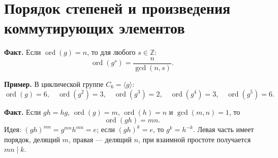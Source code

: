 \documentclass[12pt,a4paper]{article}
\newcommand{\Z}{\mathbb{Z}}
\DeclareMathOperator{\ord}{ord}
\DeclareMathOperator{\gcdop}{gcd}
\begin{document}
\section{Порядок степеней и произведения коммутирующих элементов}

\textbf{Факт.}
Если $\ord(g)=n$, то для любого $s\in\Z$:
\[
\ord(g^s)=\frac{n}{\gcdop(n,s)}.
\]

\textbf{Пример.}
В циклической группе $C_6=\langle g\rangle$:
\[
\ord(g)=6,\quad \ord(g^2)=3,\quad \ord(g^3)=2,\quad \ord(g^4)=3,\quad \ord(g^5)=6.
\]

\textbf{Факт.}
Если $gh=hg$, $\ord(g)=m$, $\ord(h)=n$ и $\gcdop(m,n)=1$, то
\[
\ord(gh)=mn.
\]
Идея: $(gh)^{mn}=g^{mn}h^{mn}=e$; если $(gh)^k=e$, то $g^k=h^{-k}$.
Левая часть имеет порядок, делящий $m$, правая — делящий $n$, при взаимной простоте получается $mn\mid k$.
\end{document}
